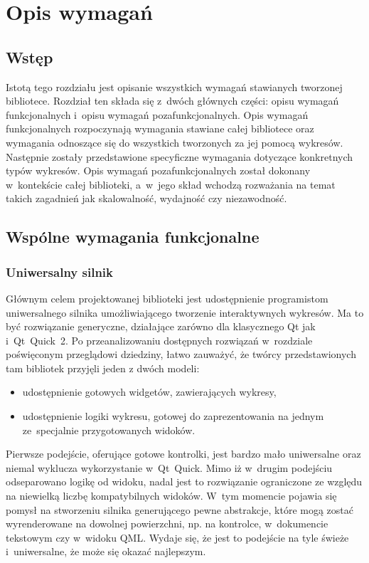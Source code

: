 \chapter{Opis wymagań}
\section{Wstęp}
Istotą tego rozdziału jest opisanie wszystkich wymagań stawianych tworzonej bibliotece. 
Rozdział ten składa się z~dwóch głównych części: opisu wymagań funkcjonalnych i~opisu wymagań pozafunkcjonalnych.\newline
Opis wymagań funkcjonalnych rozpoczynają wymagania stawiane całej bibliotece oraz wymagania odnoszące się do wszystkich tworzonych za jej pomocą wykresów. Następnie zostały przedstawione specyficzne wymagania dotyczące konkretnych typów wykresów.\newline
Opis wymagań pozafunkcjonalnych został dokonany w~kontekście całej biblioteki, a~w~jego skład wchodzą rozważania na temat takich zagadnień jak skalowalność, wydajność czy niezawodność.

\section{Wspólne wymagania funkcjonalne}
\subsection{Uniwersalny silnik}
Głównym celem projektowanej biblioteki jest udostępnienie programistom uniwersalnego silnika umożliwiającego tworzenie interaktywnych wykresów. Ma to być rozwiązanie generyczne, działające zarówno dla klasycznego Qt jak i~Qt~Quick~2. Po przeanalizowaniu dostępnych rozwiązań w~rozdziale poświęconym przeglądowi dziedziny, łatwo zauważyć, że twórcy przedstawionych tam bibliotek przyjęli jeden z dwóch modeli:
\begin{itemize}
\item{udostępnienie gotowych widgetów, zawierających wykresy,}
\item{udostępnienie logiki wykresu, gotowej do zaprezentowania na jednym ze~specjalnie przygotowanych widoków.}
\end{itemize}
Pierwsze podejście, oferujące gotowe kontrolki, jest bardzo mało uniwersalne oraz niemal wyklucza wykorzystanie w~Qt~Quick.
Mimo iż w~drugim podejściu odseparowano logikę od widoku, nadal jest to rozwiązanie ograniczone ze względu na niewielką liczbę kompatybilnych widoków.
W~tym momencie pojawia się pomysł na stworzeniu silnika generującego pewne abstrakcje, które mogą zostać wyrenderowane na dowolnej powierzchni, np. na kontrolce, w~dokumencie tekstowym czy w~widoku QML. Wydaje się, że jest to podejście na tyle świeże i~uniwersalne, że może się okazać najlepszym.

